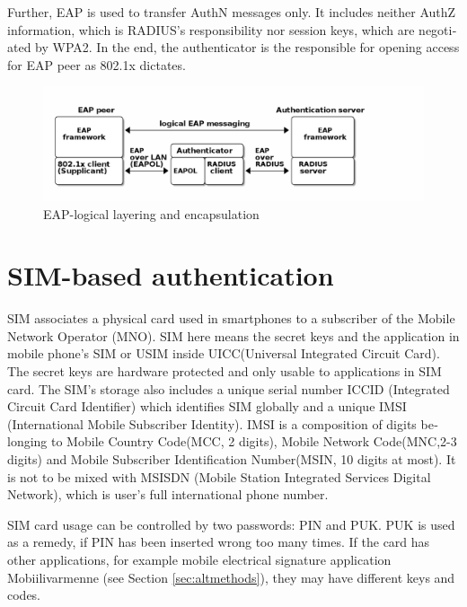 \documentclass[12pt,a4paper,english]{tutthesis}
\begin{document}
\begin{otherlanguage}{english}
Further, EAP is used to transfer AuthN messages only.
It includes neither AuthZ information, which is RADIUS's
responsibility nor session keys, which are negotiated by WPA2.  In the
end,
the authenticator is the responsible for opening access for EAP peer as 802.1x
dictates.







\begin{figure}[htb]
\centering
\includegraphics[width=.9\linewidth]{eap-layer.png}
\caption{\label{fig:eap-layers}EAP-logical layering and encapsulation}
\end{figure}



\section{SIM-based authentication}
\label{sec-2-5}
\label{sec:sim-based-auth}
SIM associates a physical card used in smartphones to
a subscriber of the Mobile Network Operator (MNO).
SIM here means the secret keys and the application in mobile phone's
SIM or USIM inside UICC(Universal Integrated Circuit Card).
The secret keys are hardware protected and only usable to applications
in SIM card.
The SIM's storage also includes a unique serial number ICCID 
(Integrated Circuit Card Identifier) which identifies SIM globally
and a unique IMSI (International Mobile Subscriber Identity). IMSI is
a composition of digits belonging to Mobile Country Code(MCC, 2
digits), Mobile Network Code(MNC,2-3 digits) and Mobile Subscriber
Identification Number(MSIN, 10 digits at most).
It is not to be mixed with MSISDN (Mobile Station Integrated Services
Digital Network), which is user's full international phone number.


SIM card usage can be controlled by two passwords: PIN and PUK.  PUK
is used as a remedy, if PIN has been inserted wrong too many times.
If the card has other applications, for example mobile electrical
signature application Mobiilivarmenne (see Section \ref{sec:altmethods}),
they may have different keys and codes.



\end{otherlanguage}
\end{document}
